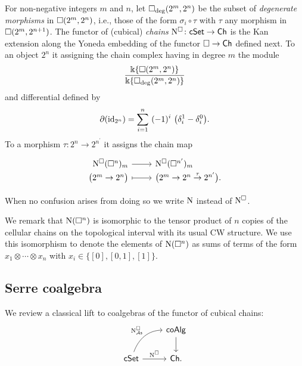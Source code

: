 For non-negative integers $m$ and $n$, let $\square_{\deg}(2^m, 2^n)$ be the subset of \textit{degenerate morphisms} in $\square(2^m, 2^n)$, i.e., those of the form $\sigma_i \circ \tau$ with $\tau$ any morphism in $\square(2^m, 2^{n+1})$.
The functor of (cubical) \textit{chains} $\operatorname{N^{\square}} \colon \mathsf{cSet} \to \mathsf{Ch}$ is the Kan extension along the Yoneda embedding of the functor $\square \to \mathsf{Ch}$ defined next.
To an object $2^n$ it assigning the chain complex having in degree $m$ the module
\begin{equation*}
\frac{\Bbbk\{\square(2^m, 2^n)\}}{\Bbbk\{\square_{\deg}(2^m, 2^n)\}}
\end{equation*}
and differential defined by
\begin{equation*}
\partial (\id_{2^n}) = \sum_{i=1}^{n} \ (-1)^i \
\big(\delta_i^1 - \delta_i^0 \big).
\end{equation*}
To a morphism $\tau \colon 2^n \to 2^{n^\prime}$ it assigns the chain map
\begin{equation*}
\begin{tikzcd}[row sep=-3pt, column sep=normal,
/tikz/column 1/.append style={anchor=base east},
/tikz/column 2/.append style={anchor=base west}]
\cchains(\cube^n)_m \arrow[r] &  \cchains(\cube^{n^\prime})_m \\
\big( 2^m \to 2^n \big) \arrow[r, mapsto] & \big( 2^m \to 2^n \stackrel{\tau}{\to} 2^{n^\prime} \big).
\end{tikzcd}
\end{equation*}

When no confusion arises from doing so we write $\operatorname{N}$ instead of $\operatorname{N^{\square}}$.

We remark that $\operatorname{N}(\square^n)$ is isomorphic to the tensor product of $n$ copies of the cellular chains on the topological interval with its usual CW structure.
We use this isomorphism to denote the elements of $\operatorname{N}(\square^n)$ as sums of terms of the form $x_1 \otimes \cdots \otimes x_n$ with $x_i \in \big\{[0], [0,1], [1] \big\}$.

\subsection{Serre coalgebra}

We review a classical lift to coalgebras of the functor of cubical chains:
\begin{equation*}
\begin{tikzcd}
& \coAlg \arrow[d] \\
\cSet \arrow[r, "\cchains"] \arrow[ur, "\cchainsAS", out=70, in=180] & \Ch.
\end{tikzcd}
\end{equation*}

